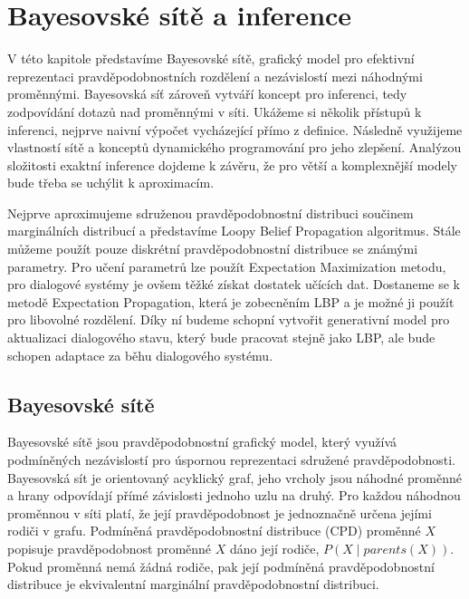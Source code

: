 \chapter{Bayesovské sítě a inference}
\label{ch:kap2}

V této kapitole představíme Bayesovské sítě, grafický model pro efektivní reprezentaci pravděpodobnostních rozdělení a nezávislostí mezi náhodnými proměnnými.
Bayesovská síť zároveň vytváří koncept pro inferenci, tedy zodpovídání dotazů nad proměnnými v síti.
Ukážeme si několik přístupů k inferenci, nejprve naivní výpočet vycházející přímo z definice.
Následně využijeme vlastností sítě a konceptů dynamického programování pro jeho zlepšení.
Analýzou složitosti exaktní inference dojdeme k závěru, že pro větší a komplexnější modely bude třeba se uchýlit k aproximacím.

Nejprve aproximujeme sdruženou pravděpodobnostní distribuci součinem marginálních distribucí a představíme Loopy Belief Propagation algoritmus.
Stále můžeme použít pouze diskrétní pravděpodobnostní distribuce se známými parametry.
Pro učení parametrů lze použít Expectation Maximization metodu, pro dialogové systémy je ovšem těžké získat dostatek učících dat.
Dostaneme se k metodě Expectation Propagation, která je zobecněním LBP a je možné ji použít pro libovolné rozdělení.
Díky ní budeme schopní vytvořit generativní model pro aktualizaci dialogového stavu, který bude pracovat stejně jako LBP, ale bude schopen adaptace za běhu dialogového systému.

\section{Bayesovské sítě}
\label{sec:bn}

Bayesovské sítě jsou pravděpodobnostní grafický model, který využívá podmíněných nezávislostí pro úspornou reprezentaci sdružené pravděpodobnosti.
Bayesovská sít je orientovaný acyklický graf, jeho vrcholy jsou náhodné proměnné a hrany odpovídají přímé závislosti jednoho uzlu na druhý.
Pro každou náhodnou proměnnou v síti platí, že její pravděpodobnost je jednoznačně určena jejími rodiči v grafu.
Podmíněná pravděpodobnostní distribuce (CPD) proměnné $X$ popisuje pravděpodobnost proměnné $X$ dáno její rodiče, $P(X \mid parents(X))$.
Pokud proměnná nemá žádná rodiče, pak její podmíněná pravděpodobnostní distribuce je ekvivalentní marginální pravděpodobnostní distribuci.

